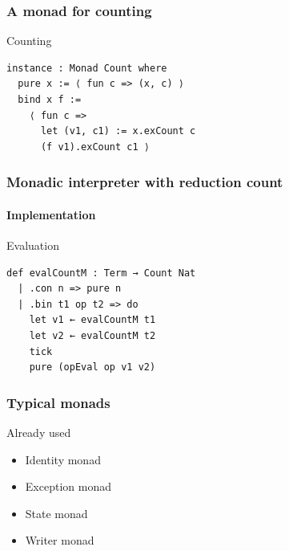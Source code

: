 \documentclass{beamer}
\begin{document}
\begin{frame}[fragile]
  \frametitle{A monad for counting}
  \begin{alertblock}{Counting}
\begin{lstlisting}
instance : Monad Count where
  pure x := ⟨ fun c => (x, c) ⟩
  bind x f :=
    ⟨ fun c =>
      let (v1, c1) := x.exCount c
      (f v1).exCount c1 ⟩
\end{lstlisting} 
\end{alertblock}
\end{frame}

\begin{frame}[fragile]
  \frametitle{Monadic interpreter with reduction count}
  \framesubtitle{Implementation}
\begin{exampleblock}{Evaluation}
\begin{lstlisting}
def evalCountM : Term → Count Nat
  | .con n => pure n
  | .bin t1 op t2 => do
    let v1 ← evalCountM t1
    let v2 ← evalCountM t2
    tick
    pure (opEval op v1 v2)
\end{lstlisting} 
\end{exampleblock}
\end{frame}            

\begin{frame}[fragile]
  \frametitle{Typical monads}
  \begin{block}{Already used}
  \begin{itemize}       
  \item Identity monad
  \item Exception monad
  \item State monad
  \item Writer monad
  \end{itemize} 
  \end{block}   
\end{frame}
\end{document}
